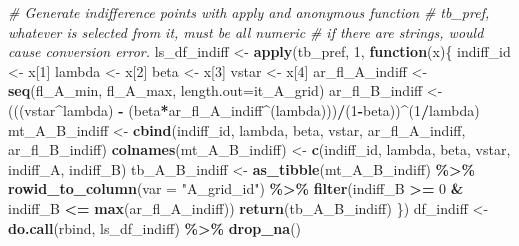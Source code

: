 \documentclass[
]{book}
\newenvironment{Shaded}{\begin{snugshade}}{\end{snugshade}}
\newcommand{\CommentTok}[1]{\textcolor[rgb]{0.56,0.35,0.01}{\textit{#1}}}
\newcommand{\ControlFlowTok}[1]{\textcolor[rgb]{0.13,0.29,0.53}{\textbf{#1}}}
\newcommand{\DataTypeTok}[1]{\textcolor[rgb]{0.13,0.29,0.53}{#1}}
\newcommand{\DecValTok}[1]{\textcolor[rgb]{0.00,0.00,0.81}{#1}}
\newcommand{\KeywordTok}[1]{\textcolor[rgb]{0.13,0.29,0.53}{\textbf{#1}}}
\newcommand{\NormalTok}[1]{#1}
\newcommand{\OperatorTok}[1]{\textcolor[rgb]{0.81,0.36,0.00}{\textbf{#1}}}
\newcommand{\StringTok}[1]{\textcolor[rgb]{0.31,0.60,0.02}{#1}}
\begin{document}
\begin{Shaded}
\begin{Highlighting}[]
\CommentTok{\# Generate indifference points with apply and anonymous function}
\CommentTok{\# tb\_pref, whatever is selected from it, must be all numeric}
\CommentTok{\# if there are strings, would cause conversion error.}
\NormalTok{ls\_df\_indiff \textless{}{-}}\StringTok{ }\KeywordTok{apply}\NormalTok{(tb\_pref, }\DecValTok{1}\NormalTok{, }\ControlFlowTok{function}\NormalTok{(x)\{}
\NormalTok{  indiff\_id \textless{}{-}}\StringTok{ }\NormalTok{x[}\DecValTok{1}\NormalTok{]}
\NormalTok{  lambda \textless{}{-}}\StringTok{ }\NormalTok{x[}\DecValTok{2}\NormalTok{]}
\NormalTok{  beta \textless{}{-}}\StringTok{ }\NormalTok{x[}\DecValTok{3}\NormalTok{]}
\NormalTok{  vstar \textless{}{-}}\StringTok{ }\NormalTok{x[}\DecValTok{4}\NormalTok{]}
\NormalTok{  ar\_fl\_A\_indiff \textless{}{-}}\StringTok{ }\KeywordTok{seq}\NormalTok{(fl\_A\_min, fl\_A\_max, }\DataTypeTok{length.out=}\NormalTok{it\_A\_grid)}
\NormalTok{  ar\_fl\_B\_indiff \textless{}{-}}\StringTok{ }\NormalTok{(((vstar}\OperatorTok{\^{}}\NormalTok{lambda) }\OperatorTok{{-}}\StringTok{ }
\StringTok{                        }\NormalTok{(beta}\OperatorTok{*}\NormalTok{ar\_fl\_A\_indiff}\OperatorTok{\^{}}\NormalTok{(lambda)))}\OperatorTok{/}\NormalTok{(}\DecValTok{1}\OperatorTok{{-}}\NormalTok{beta))}\OperatorTok{\^{}}\NormalTok{(}\DecValTok{1}\OperatorTok{/}\NormalTok{lambda)}
\NormalTok{  mt\_A\_B\_indiff \textless{}{-}}\StringTok{ }\KeywordTok{cbind}\NormalTok{(indiff\_id, lambda, beta, vstar,}
\NormalTok{                         ar\_fl\_A\_indiff, ar\_fl\_B\_indiff)}
  \KeywordTok{colnames}\NormalTok{(mt\_A\_B\_indiff) \textless{}{-}}\StringTok{ }\KeywordTok{c}\NormalTok{(}\StringTok{\textquotesingle{}indiff\_id\textquotesingle{}}\NormalTok{, }\StringTok{\textquotesingle{}lambda\textquotesingle{}}\NormalTok{, }\StringTok{\textquotesingle{}beta\textquotesingle{}}\NormalTok{, }\StringTok{\textquotesingle{}vstar\textquotesingle{}}\NormalTok{,}
                               \StringTok{\textquotesingle{}indiff\_A\textquotesingle{}}\NormalTok{, }\StringTok{\textquotesingle{}indiff\_B\textquotesingle{}}\NormalTok{)}
\NormalTok{  tb\_A\_B\_indiff \textless{}{-}}\StringTok{ }\KeywordTok{as\_tibble}\NormalTok{(mt\_A\_B\_indiff) }\OperatorTok{\%\textgreater{}\%}\StringTok{ }
\StringTok{    }\KeywordTok{rowid\_to\_column}\NormalTok{(}\DataTypeTok{var =} \StringTok{"A\_grid\_id"}\NormalTok{) }\OperatorTok{\%\textgreater{}\%}\StringTok{ }
\StringTok{    }\KeywordTok{filter}\NormalTok{(indiff\_B }\OperatorTok{\textgreater{}=}\StringTok{ }\DecValTok{0} \OperatorTok{\&}\StringTok{ }\NormalTok{indiff\_B }\OperatorTok{\textless{}=}\StringTok{ }\KeywordTok{max}\NormalTok{(ar\_fl\_A\_indiff))}
  \KeywordTok{return}\NormalTok{(tb\_A\_B\_indiff)}
\NormalTok{\})}
\NormalTok{df\_indiff \textless{}{-}}\StringTok{ }\KeywordTok{do.call}\NormalTok{(rbind, ls\_df\_indiff) }\OperatorTok{\%\textgreater{}\%}\StringTok{ }\KeywordTok{drop\_na}\NormalTok{()}
\end{Highlighting}
\end{Shaded}
\end{document}
